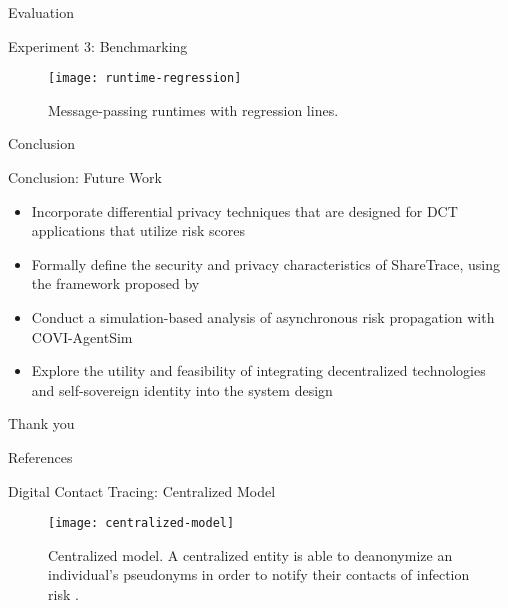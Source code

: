\documentclass[11pt]{beamer}
\begin{document}
\begin{section}{Evaluation}
\begin{frame}{Experiment 3: Benchmarking}
\begin{figure}
  \centering
  \texttt{[image: runtime-regression]}
  \caption[Message-passing runtimes with regression lines]{Message-passing runtimes with regression lines.}
\end{figure}
\end{frame}

\end{section}

\begin{section}{Conclusion}

\begin{frame}{Conclusion: Future Work}
\begin{itemize}
  \item Incorporate differential privacy techniques that are designed for DCT applications that utilize risk scores \citep{Romijnders2024}
  \pause
  \item Formally define the security and privacy characteristics of ShareTrace, using the framework proposed by \citet{Kuhn2021}
  \pause
  \item Conduct a simulation-based analysis of asynchronous risk propagation with COVI-AgentSim \citep{Gupta2020}
  \pause
  \item Explore the utility and feasibility of integrating decentralized technologies \citep{Troncoso2017, Trautwein2022, Shi2024, Keizer2024} and self-sovereign identity \citep{Preukschat2021} into the system design
\end{itemize}
\end{frame}

\begin{frame}[c]{ }
  \centering
  \Huge
  Thank you
\end{frame}

\end{section}

\begin{frame}[allowframebreaks]{References}
  \printbibliography
\end{frame}

\appendix

\begin{frame}{Digital Contact Tracing: Centralized Model}
\begin{figure}
  \centering
  \texttt{[image: centralized-model]}
  \caption[Centralized model]{Centralized model. A centralized entity is able to deanonymize an individual's pseudonyms in order to notify their contacts of infection risk \cite{Reichert2021}.}
\end{figure}
\end{frame}
\end{document}
